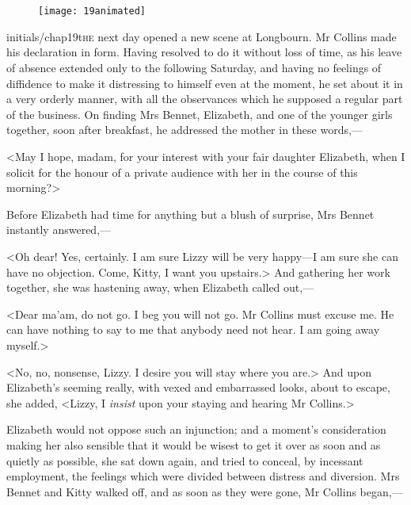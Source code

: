 \chapter[Chapter \thechapter]{}

\begin{figure}[t!]
\centering
\texttt{[image: 19animated]}
\end{figure}

\lettrine[lines=6,image=true]{initials/chap19t}{he}  next day opened a new scene at Longbourn. Mr Collins made his declaration in form. Having resolved to do it without loss of time, as his leave of absence extended only to the following Saturday, and having no feelings of diffidence to make it distressing to himself even at the moment, he set about it in a very orderly manner, with all the observances which he supposed a regular part of the business. On finding Mrs Bennet, Elizabeth, and one of the younger girls together, soon after breakfast, he addressed the mother in these words,—

<May I hope, madam, for your interest with your fair daughter Elizabeth, when I solicit for the honour of a private audience with her in the course of this morning?>

Before Elizabeth had time for anything but a blush of surprise, Mrs Bennet instantly answered,—

<Oh dear! Yes, certainly. I am sure Lizzy will be very happy—I am sure she can have no objection. Come, Kitty, I want you upstairs.> And gathering her work together, she was hastening away, when Elizabeth called out,—

<Dear ma'am, do not go. I beg you will not go. Mr Collins must excuse me. He can have nothing to say to me that anybody need not hear. I am going away myself.>

<No, no, nonsense, Lizzy. I desire you will stay where you are.> And upon Elizabeth's seeming really, with vexed and embarrassed looks, about to escape, she added, <Lizzy, I \textit{insist} upon your staying and hearing Mr Collins.>

Elizabeth would not oppose such an injunction; and a moment's consideration making her also sensible that it would be wisest to get it over as soon and as quietly as possible, she sat down again, and tried to conceal, by incessant employment, the feelings which were divided between distress and diversion. Mrs Bennet and Kitty walked off, and as soon as they were gone, Mr Collins began,—

